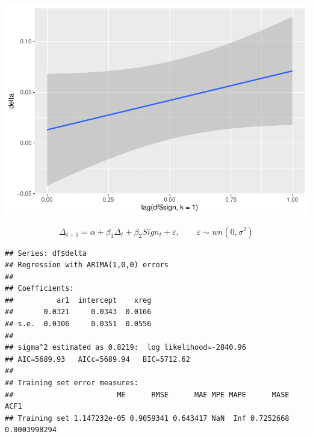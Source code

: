 \documentclass[11pt, a4paper]{report}
\newenvironment{Shaded}{\begin{snugshade}}{\end{snugshade}}
\newcommand{\DataTypeTok}[1]{\textcolor[rgb]{0.13,0.29,0.53}{#1}}
\newcommand{\DecValTok}[1]{\textcolor[rgb]{0.00,0.00,0.81}{#1}}
\newcommand{\KeywordTok}[1]{\textcolor[rgb]{0.13,0.29,0.53}{\textbf{#1}}}
\newcommand{\NormalTok}[1]{#1}
\newcommand{\OperatorTok}[1]{\textcolor[rgb]{0.81,0.36,0.00}{\textbf{#1}}}
\newcommand{\StringTok}[1]{\textcolor[rgb]{0.31,0.60,0.02}{#1}}
\theoremstyle{plain}
\theoremstyle{plain}
\theoremstyle{remark}
\begin{document}
\begin{center}\includegraphics{Econo2_P1_files/figure-latex/lm signt-1} \end{center}

\[\Delta_{t+1} = \alpha + \beta_1 \Delta_t + \beta_2Sign_t + \varepsilon, \hspace{2em} \varepsilon \sim wn(0, \sigma^2)\]

\begin{Shaded}
\end{Shaded}

\begin{verbatim}
## Series: df$delta 
## Regression with ARIMA(1,0,0) errors 
## 
## Coefficients:
##          ar1  intercept    xreg
##       0.0321     0.0343  0.0166
## s.e.  0.0306     0.0351  0.0556
## 
## sigma^2 estimated as 0.8219:  log likelihood=-2840.96
## AIC=5689.93   AICc=5689.94   BIC=5712.62
## 
## Training set error measures:
##                        ME      RMSE      MAE MPE MAPE      MASE         ACF1
## Training set 1.147232e-05 0.9059341 0.643417 NaN  Inf 0.7252668 0.0003998294
\end{verbatim}

\begin{Shaded}
\end{Shaded}
\end{document}
